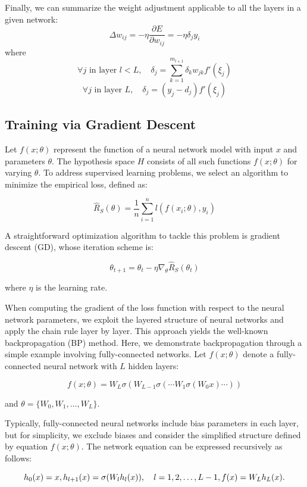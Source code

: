 \documentclass[a4paper]{report}
\begin{document}
{Finally, we can summarize the weight adjustment applicable to all the layers in a given network:
\[ \Delta w_{ij} = -\eta \frac{\partial E}{\partial w_{ij}} = -\eta \delta_j y_i \]
where
\[ \forall j \text{ in layer } l < L, \quad \delta_j = \sum_{k=1}^{m_{l+1}} \delta_k w_{jk} f'(\xi_j) \]
\[ \forall j \text{ in layer } L, \quad \delta_j = (y_j - d_j) f'(\xi_j) \]
\subsection{Training via Gradient Descent}

Let $f(x; \theta)$ represent the function of a neural network model with input $x$ and parameters $\theta$. The hypothesis space $H$ consists of all such functions $f(x; \theta)$ for varying $\theta$. To address supervised learning problems, we select an algorithm to minimize the empirical loss, defined as:

\[
\hat{R}_S(\theta) = \frac{1}{n} \sum_{i=1}^{n} l(f(x_i; \theta), y_i)
\]

A straightforward optimization algorithm to tackle this problem is gradient descent (GD), whose iteration scheme is:

\[
\theta_{t+1} = \theta_t - \eta \nabla_{\theta} \hat{R}_S(\theta_t)
\]

where $\eta$ is the learning rate.

When computing the gradient of the loss function with respect to the neural network parameters, we exploit the layered structure of neural networks and apply the chain rule layer by layer. This approach yields the well-known backpropagation (BP) method. Here, we demonstrate backpropagation through a simple example involving fully-connected networks. Let $f(x; \theta)$ denote a fully-connected neural network with $L$ hidden layers:

\[
f(x; \theta) = W_L \sigma(W_{L-1} \sigma(\dotsb W_1 \sigma(W_0 x) \dotsb ))
\]

and $\theta = \{W_0, W_1, \dotsc, W_L\}$.

Typically, fully-connected neural networks include bias parameters in each layer, but for simplicity, we exclude biases and consider the simplified structure defined by equation $f(x;\theta)$. The network equation can be expressed recursively as follows:

\[
h_0(x) = x, \\
h_{l+1}(x) = \sigma(W_l h_l(x)), \quad l = 1, 2, \dotsc, L-1, \\
f(x) = W_L h_L(x).
\]

}
\end{document}
